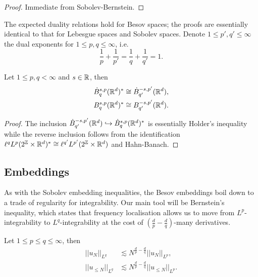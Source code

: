 \begin{proof}
	Immediate from Sobolev-Bernstein. 
\end{proof}

The expected duality relations hold for Besov spaces; the proofs are essentially identical to that for Lebesgue spaces and Sobolev spaces. Denote $1 \leq p', q' \leq \infty$ the dual exponents for $1 \leq p, q \leq \infty$, i.e.
	\[ \frac1p + \frac{1}{p'} = \frac1q + \frac{1}{q'} = 1. \]

\begin{theorem}[Duality]
	Let $1 \leq p, q < \infty$ and $s \in \mathbb R$, then 
		\begin{align*}
			\dot B^{s, p}_{q} (\mathbb R^d)^* 
				&\cong \dot B^{-s, p'}_{q'} (\mathbb R^d), \\
			B^{s, p}_{q} (\mathbb R^d)^* 
				&\cong  B^{-s, p'}_{q'} (\mathbb R^d).
		\end{align*}
\end{theorem}

\begin{proof}\cite[Theorem 2.11.2]{Triebel1983}
	The inclusion $\dot B^{-s, p'}_{q'} (\mathbb R^d) \hookrightarrow \dot B^{s, p}_{q} (\mathbb R^d)^* $ is essentially Holder's inequality while the reverse inclusion follows from the identification $\ell^q L^p (2^\mathbb Z \times \mathbb R^d)^* \cong \ell^{q'} L^{p'} (2^\mathbb Z \times \mathbb R^d)$ and Hahn-Banach. 
\end{proof}

\subsection{Embeddings}

As with the Sobolev embedding inequalities, the Besov embeddings boil down to a trade of regularity for integrability. Our main tool will be Bernstein's inequality, which states that frequency localisation allows us to move from $L^p$-integrability to $L^q$-integrability at the cost of $(\tfrac{d}{p} - \tfrac{d}{q})$-many derivatives. 

\begin{lemma}
\label{lem:bernstein}
	Let $1 \leq p \leq q \leq \infty$, then 
	\begin{align*}
					||u_N||_{L^q} 
						&\lesssim N^{\frac{d}{p} - \frac{d}{q}} ||u_N||_{L^p}, \\
					||u_{\leq N}||_{L^q} 
						&\lesssim N^{\frac{d}{p} - \frac{d}{q}} ||u_{\leq N}||_{L^p}. 
	\end{align*}
\end{lemma}


